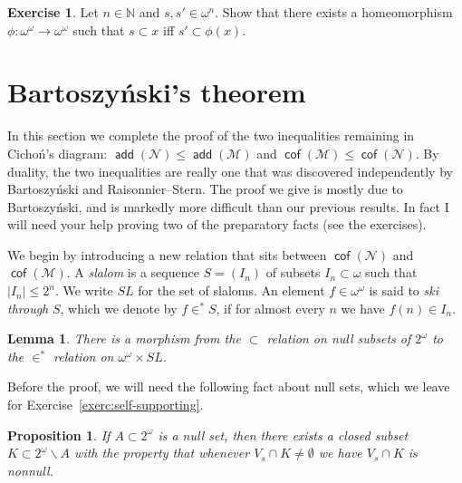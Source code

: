 \documentclass[11pt,oneside]{amsbook}
\newcommand{\NN}{\mathbb N}
\newcommand{\Null}{\mathcal N}
\newcommand{\Meager}{\mathcal M}
\DeclareMathOperator{\add}{\mathsf{add}}
\DeclareMathOperator{\cof}{\mathsf{cof}}
\theoremstyle{definition}
\newtheorem{exerc}{Exercise}[section]
\theoremstyle{plain}
\newtheorem{lem}[thm]{Lemma}
\newtheorem{prop}[thm]{Proposition}
\theoremstyle{definition}
\theoremstyle{remark}
\numberwithin{equation}{section}
\numberwithin{figure}{section}
\begin{document}
\begin{exerc}
  \label{exerc:homeo}
  Let $n\in\NN$ and $s,s'\in\omega^n$. Show that there exists a homeomorphism $\phi\colon\omega^\omega\to\omega^\omega$ such that $s\subset x$ iff $s'\subset\phi(x)$.
\end{exerc}



\section{Bartoszy\'nski's theorem}

In this section we complete the proof of the two inequalities remaining in Cicho\'n's diagram: $\add(\Null)\leq\add(\Meager)$ and $\cof(\Meager)\leq\cof(\Null)$. By duality, the two inequalities are really one that was discovered independently by Bartoszy\'nski and Raisonnier--Stern. The proof we give is mostly due to Bartoszy\'nski, and is markedly more difficult than our previous results. In fact I will need your help proving two of the preparatory facts (see the exercises).

We begin by introducing a new relation that sits between $\cof(\Null)$ and $\cof(\Meager)$. A \emph{slalom} is a sequence $S=(I_n)$ of subsets $I_n\subset\omega$ such that $|I_n|\leq2^n$. We write $SL$ for the set of slaloms. An element $f\in\omega^\omega$ is said to \emph{ski through} $S$, which we denote by $f\in^*S$, if for almost every $n$ we have $f(n)\in I_n$.

\begin{lem}
  \label{lem:null-slalom}
  There is a morphism from the $\subset$ relation on null subsets of $2^\omega$ to the $\in^*$ relation on $\omega^\omega\times SL$.
\end{lem}

Before the proof, we will need the following fact about null sets, which we leave for Exercise~\ref{exerc:self-supporting}.

\begin{prop}
  \label{prop:self-supporting}
  If $A\subset2^\omega$ is a null set, then there exists a closed subset $K\subset2^\omega\smallsetminus A$ with the property that whenever $V_s\cap K\neq\emptyset$ we have $V_s\cap K$ is nonnull.
\end{prop}
\end{document}
